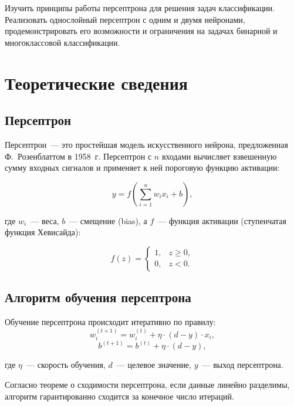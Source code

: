 \documentclass[14pt,a4paper]{extarticle}
\begin{document}
Изучить принципы работы персептрона для решения задач классификации. Реализовать однослойный персептрон с одним и двумя нейронами, продемонстрировать его возможности и ограничения на задачах бинарной и многоклассовой классификации.

\section{Теоретические сведения}

\subsection{Персептрон}

Персептрон~--- это простейшая модель искусственного нейрона, предложенная Ф.~Розенблаттом в 1958~г. Персептрон с $n$ входами вычисляет взвешенную сумму входных сигналов и применяет к ней пороговую функцию активации:

\begin{equation}
y = f\left(\sum_{i=1}^{n} w_i x_i + b\right),
\end{equation}

где $w_i$~--- веса, $b$~--- смещение (bias), а $f$~--- функция активации (ступенчатая функция Хевисайда):

\begin{equation}
f(z) = \begin{cases} 1, & z \geq 0, \\ 0, & z < 0. \end{cases}
\end{equation}

\subsection{Алгоритм обучения персептрона}

Обучение персептрона происходит итеративно по правилу:
\begin{equation}
w_i^{(t+1)} = w_i^{(t)} + \eta \cdot (d - y) \cdot x_i,
\end{equation}
\begin{equation}
b^{(t+1)} = b^{(t)} + \eta \cdot (d - y),
\end{equation}

где $\eta$~--- скорость обучения, $d$~--- целевое значение, $y$~--- выход персептрона.

Согласно теореме о сходимости персептрона, если данные линейно разделимы, алгоритм гарантированно сходится за конечное число итераций.
\end{document}
